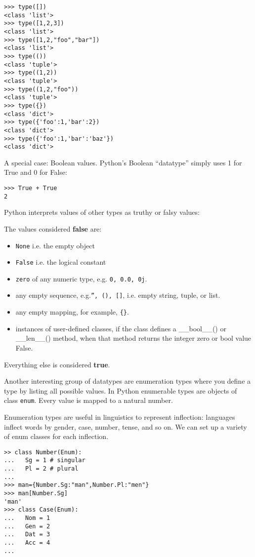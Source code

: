 \documentclass{scrartcl}
\begin{document}
\begin{verbatim}
>>> type([])
<class 'list'>
>>> type([1,2,3])
<class 'list'>
>>> type([1,2,"foo","bar"])
<class 'list'>
>>> type(())
<class 'tuple'>
>>> type((1,2))
<class 'tuple'>
>>> type((1,2,"foo"))
<class 'tuple'>
>>> type({})
<class 'dict'>
>>> type({'foo':1,'bar':2})
<class 'dict'>
>>> type({'foo':1,'bar':'baz'})
<class 'dict'>
\end{verbatim}

A special case: Boolean values. Python's Boolean ``datatype'' simply uses 1 for True and 0 for False:

\begin{verbatim}
>>> True + True
2
\end{verbatim}

Python interprets values of other types as truthy or falsy values:

The values considered \textbf{false} are: 
\begin{itemize}
\item \texttt{None} i.e. the empty object
\item \texttt{False} i.e. the logical constant
\item \texttt{zero} of any numeric type, e.g. \texttt{0, 0.0, 0j}.
\item any empty sequence, e.g.\texttt{'', (), []}, i.e. empty string, tuple, or list.
\item any empty mapping, for example, \texttt{\{\}}.
\item instances of user-defined classes, if the class defines a \_\_bool\_\_() or \_\_len\_\_() method, when that method returns the integer zero or bool value False.
\end{itemize}

Everything else is considered \textbf{true}.

Another interesting group of datatypes are enumeration types where you define a type by listing all possible values. In Python enumerable types are objects of class \texttt{enum}. Every value is mapped to a natural number.

Enumeration types are useful in linguistics to represent inflection: languages inflect words by gender, case, number, tense, and so on. We can set up a variety of enum classes for each inflection.

\begin{verbatim}
>> class Number(Enum):
...   Sg = 1 # singular
...   Pl = 2 # plural
... 
>>> man={Number.Sg:"man",Number.Pl:"men"}
>>> man[Number.Sg]
'man'
>>> class Case(Enum):
...   Nom = 1
...   Gen = 2
...   Dat = 3
...   Acc = 4
... 
\end{verbatim}
\end{document}
